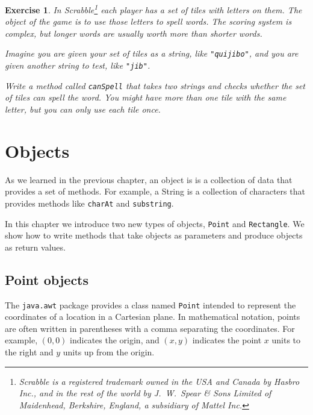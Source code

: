 \documentclass[12pt]{book}
\theoremstyle{exercise}
\newtheorem{exercise}{Exercise}[chapter]
\newcommand{\java}[1]{\verb"#1"}
\begin{document}
\begin{exercise}

In Scrabble\footnote{Scrabble is a registered trademark owned in the USA and Canada by Hasbro Inc., and in the rest of the world by J.\ W.\ Spear \& Sons Limited of Maidenhead, Berkshire, England, a subsidiary of Mattel Inc.} each player has a set of tiles with letters on them.
The object of the game is to use those letters to spell words.
The scoring system is complex, but longer words are usually worth more than shorter words.

Imagine you are given your set of tiles as a string, like \verb|"quijibo"|, and you are given another string to test, like \verb|"jib"|.

Write a method called \java{canSpell} that takes two strings and checks whether the set of tiles can spell the word.
You might have more than one tile with the same letter, but you can only use each tile once.

\end{exercise}


\chapter{Objects}
\label{objects}


As we learned in the previous chapter, an object is is a collection of data that provides a set of methods.
For example, a String is a collection of characters that provides methods like \java{charAt} and \java{substring}.

In this chapter we introduce two new types of objects, \java{Point} and \java{Rectangle}.
We show how to write methods that take objects as parameters and produce objects as return values.


\section{Point objects}
\label{point}

The \java{java.awt} package provides a class named \java{Point} intended to represent the coordinates of a location in a Cartesian plane.
In mathematical notation, points are often written in parentheses with a comma separating the coordinates.
For example, $(0,0)$ indicates the origin, and $(x,y)$ indicates the point $x$ units to the right and $y$ units up from the origin.

\end{document}
